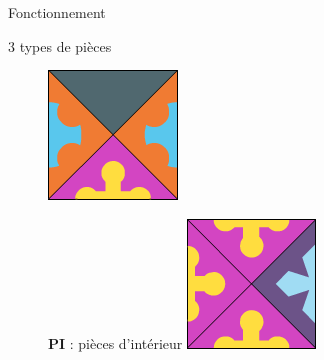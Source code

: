 \begin{frame}{Fonctionnement}
\begin{Vblock}{3 types de pièces}
\begin{minipage}{0.32\textwidth}
\begin{figure}[H]
					\includegraphics[width=\textwidth]{images/piece_bord}
				\end{figure}
			\end{minipage}\hfill
			\pause
			\begin{minipage}{0.32\textwidth}
				\begin{figure}[H]
					\textbf{PI} : pièces d'intérieur
					\includegraphics[width=\textwidth]{images/piece_interieure}
				\end{figure}
			\end{minipage}
		\end{Vblock}
	\end{frame}
	

